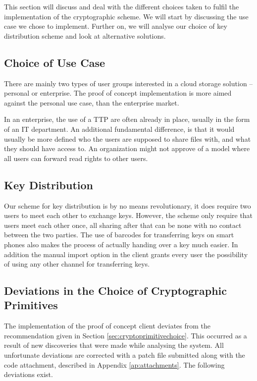 \documentclass[pdftex,english,10pt,b5paper,twoside]{book}
\begin{document}
This section will discuss and deal with the different choices taken to fulfil
the implementation of the cryptographic scheme. We will start by discussing the
use case we chose to implement. Further on, we will analyse our choice of key
distribution scheme and look at alternative solutions. 

\subsection{Choice of Use Case}

There are mainly two types of user groups interested in a cloud storage
solution -- personal or enterprise. The proof of concept implementation is more
aimed against the personal use case, than the enterprise market. 

In an enterprise, the use of a \ac{TTP} are often already in place, usually in
the form of an IT department. An additional fundamental difference, is that it
would usually be more defined who the users are supposed to share files with,
and what they should have access to. An organization might not approve of a
model where all users can forward read rights to other users.

\subsection{Key Distribution} 

Our scheme for key distribution is by no means revolutionary, it does require
two users to meet each other to exchange keys. However, the scheme only require
that users meet each other once, all sharing after that can be none with no
contact between the two parties. The use of barcodes for transferring keys on
smart phones also makes the process of actually handing over a key much easier.
In addition the manual import option in the client grants every user the
possibility of using any other channel for transferring keys. 

\subsection{Deviations in the Choice of Cryptographic Primitives}

The implementation of the proof of concept client deviates from the
recommendation given in Section \ref{sec:cryptoprimitivechoice}.  This occurred
as a result of new discoveries that were made while analysing the system. All
unfortunate deviations are corrected with a patch file submitted along with the
code attachment, described in Appendix \ref{ap:attachments}. The following
deviations exist.
\end{document}
